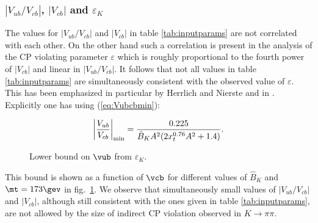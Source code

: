 \subsubsection{$\left| V_{ub}/V_{cb} \right|$,
$\left| V_{cb} \right|$ and $\varepsilon_K$}

The values for $\left| V_{ub}/V_{cb} \right|$ 
and $\left| V_{cb} \right|$ in table \ref{tab:inputparams}
are not correlated with
each other. On the other hand such a correlation is present in
the analysis of the CP violating parameter $\varepsilon$ which
is roughly proportional to the fourth power of $\left| V_{cb}\right|$
and linear in $\left|V_{ub}/V_{cb} \right|$. It follows
that not all values in table \ref{tab:inputparams} are simultaneously
consistent with the observed value of $\varepsilon$.
This 
has been emphasized in particular by
Herrlich and Nierste \cite{HNb} and in \cite{BBL}. 
Explicitly one has using (\ref{eq:Vubcbmin}):

\begin{equation}
\left| \frac{V_{ub}}{V_{cb}} \right|_{\rm min}=
\frac{0.225}{\hat B_K A^2(2 x_t^{0.76}A^2+1.4)}.
\end{equation}

\begin{figure}[hbt]
\vspace{0.10in}
\centerline{
\epsfysize=4.5in
}
\vspace{0.08in}
\caption{Lower bound on $\vub$ from $\varepsilon_K$.}\label{fig:bound}
\end{figure}

This bound is shown as a function of $\vcb$ for different
values of $\hat B_K$ and $\mt=173\gev$ in fig.\ \ref{fig:bound}. 
We observe that simultaneously
small values of $\left| V_{ub}/V_{cb} \right|$ and $\left| V_{cb} \right|$,
although still consistent with the ones given in 
table \ref{tab:inputparams}, are not allowed
by the size of indirect CP violation observed in $K \to \pi\pi$.


